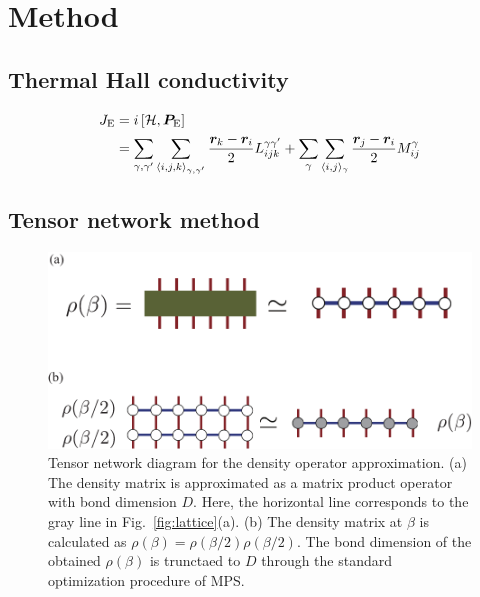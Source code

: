 \documentclass[reprint,amsmath,amssymb,aps,prx]{revtex4-2}
\begin{document}
\section{Method}
  \subsection{Thermal Hall conductivity}
  \begin{align}
   J_{\mathrm{E}} &=  i \left[\mathcal{H}, \bm{P}_{\mathrm{E}}\right] \notag \\
&= \sum_{\gamma,\gamma'}\sum_{\langle i,j,k\rangle_{\gamma,\gamma'}} \frac{\bm{r}_k-\bm{r}_i}{2}L_{ijk}^{\gamma\gamma'} + \sum_{\gamma}\sum_{\langle i,j\rangle_{\gamma}} \frac{\bm{r}_j-\bm{r}_i}{2}M_{ij}^{\gamma} 
   \label{eq:def_J}
  \end{align}
  \subsection{Tensor network method}
\begin{figure}
  \begin{center}
    \includegraphics[width=\linewidth]{XTRG_MPO.pdf}
  \end{center}
  \caption{Tensor network diagram for the density operator approximation. (a) The density matrix is approximated as a matrix product operator with bond dimension $D$. Here, the horizontal line corresponds to the gray line in Fig.~\ref{fig:lattice}(a). (b) The density matrix at $\beta$ is calculated as $\rho(\beta)=\rho(\beta/2)\rho(\beta/2)$. The bond dimension of the obtained $\rho(\beta)$ is trunctaed to $D$ through the standard optimization procedure of MPS.}
  \label{fig:XTRG}
\end{figure}
\end{document}
